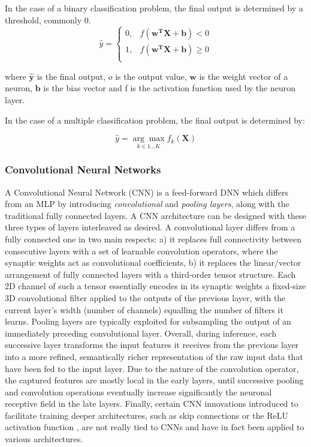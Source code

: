 \documentclass[preprint,review,12pt]{elsarticle}
\begin{document}
In the case of a binary classification problem, the final output is determined by a threshold, commonly $0$. 
\begin{equation}
    \hat{y}= \left\{
    \begin{array}{ll}
       0, & f(\mathbf{w^T} \mathbf{X} + \mathbf{b}) < 0 \\
       1, & f(\mathbf{w^T} \mathbf{X} + \mathbf{b}) \ge 0\\
    \end{array} 
    \right. 
\label{eq::MLP2}
\end{equation}


\noindent where $\mathbf{\hat{y}}$ is the final output, $o$ is the output value, $\mathbf{w}$ is the weight vector of a neuron, $\mathbf{b}$ is the bias vector and f is the activation function used by the neuron layer.

In the case of a multiple classification problem, the final output is determined by:

\begin{equation}
    \hat{y} = \underset{k\in{1...K}}{\arg\max}f_k(\mathbf{X})
\label{eq::MLP3}    
\end{equation}

\subsubsection{Convolutional Neural Networks}
A Convolutional Neural Network (CNN) \cite{lenet}\cite{alexnet} is a feed-forward DNN which differs from an MLP by introducing \textit{convolutional} and \textit{pooling layers}, along with the traditional fully connected layers. A CNN architecture can be designed with these three types of layers interleaved as desired. A convolutional layer differs from a fully connected one in two main respects: a) it replaces full connectivity between consecutive layers with a set of learnable convolution operators, where the synaptic weights act as convolutional coefficients, b) it replaces the linear/vector arrangement of fully connected layers with a third-order tensor structure. Each 2D channel of such a tensor essentially encodes in its synaptic weights a fixed-size 3D convolutional filter applied to the outputs of the previous layer, with the current layer's width (number of channels) equalling the number of filters it learns. Pooling layers are typically exploited for subsampling the output of an immediately preceding convolutional layer. Overall, during inference, each successive layer transforms the input features it receives from the previous layer into a more refined, semantically richer representation of the raw input data that have been fed to the input layer. Due to the nature of the convolution operator, the captured features are mostly local in the early layers, until successive pooling and convolution operations eventually increase significantly the neuronal receptive field in the late layers. Finally, certain CNN innovations introduced to facilitate training deeper architectures, such as skip connections \cite{huynh} or the ReLU activation function \cite{alexnet}, are not really tied to CNNs and have in fact been applied to various architectures.
\end{document}
